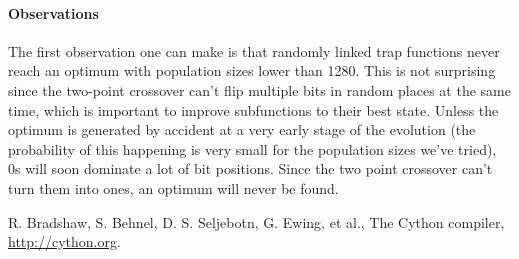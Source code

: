 \documentclass[12pt]{article}
\theoremstyle{definition}
\begin{document}
\paragraph{Observations}
The first observation one can make is that randomly linked trap functions never reach an optimum with population sizes lower than 1280.
This is not surprising since the two-point crossover can't flip multiple bits
in random places at the same time, which is important to improve subfunctions to their best state.
Unless the optimum is generated by accident at a very early stage of the evolution
(the probability of this happening is very small for the population sizes we've tried),
0s will soon dominate a lot of bit positions.
Since the two point crossover can't turn them into ones, an optimum will never be found.


\begin{thebibliography}{9}

R. Bradshaw, S. Behnel, D. S. Seljebotn, G. Ewing, et al.,
The Cython compiler, \url{http://cython.org}.

\end{thebibliography}
\end{document}
